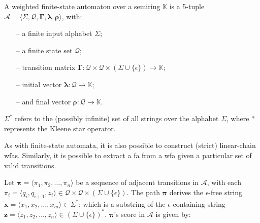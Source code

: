 \begin{definition}
  \label{def:wfa}
  A weighted finite-state automaton over a semiring $\mathbb{K}$ is a 5-tuple
  $\mathcal{A} = \langle \Sigma, \mathcal{Q}, \bm{\Gamma}, \bm{\lambda}, \bm{\rho} \rangle$,
  with:

  \begin{itemize}
    \itemsep0em
    \item[--] a finite input alphabet $\Sigma$;
    \item[--] a finite state set $\mathcal{Q}$;
    \item[--] transition matrix $\bm{\Gamma}: \mathcal{Q} \times \mathcal{Q} \times
    (\Sigma \cup \{\epsilon\}) \rightarrow \mathbb{K}$;
    \item[--] initial vector $\bm{\lambda}: \mathcal{Q} \rightarrow \mathbb{K}$;
    \item[--] and final vector $\bm{\rho}: \mathcal{Q} \rightarrow \mathbb{K}$.
  \end{itemize}

  \begin{remark}
    $\Sigma^{*}$ refers to the (possibly infinite) set of all strings over the
    alphabet $\Sigma$, where * represents the Kleene star operator.
  \end{remark}

  \begin{remark}
    As with finite-state automata, it is also possible to construct (strict)
    linear-chain \ac{wfas}. Similarly, it is possible to
    extract a \ac{fa} from a \ac{wfa} given a particular set of valid transitions.
  \end{remark}
 
\end{definition}

\begin{definition}

  Let $\bm{\pi} = \langle \pi_1, \pi_2, \dots, \pi_n \rangle$ be a sequence of
  adjacent transitions in $\mathcal{A}$, with each $\pi_i = \langle q_i,
  q_{i+1}, z_i \rangle \in \mathcal{Q} \times \mathcal{Q} \times (\Sigma \cup
  \{\epsilon\})$. The path $\bm{\pi}$ derives the $\epsilon$-free string
  $\bm{x} = \langle x_1, x_2, \dots, x_m \rangle \in \Sigma^{*}$; which is a
  substring of the $\epsilon$-containing string $\bm{z} = \langle z_1, z_2,
  \dots, z_n \rangle \in (\Sigma \cup \{\epsilon\})^{*}$. $\bm{\pi}$'s score in
  $\mathcal{A}$ is given by:
  
\end{definition}

